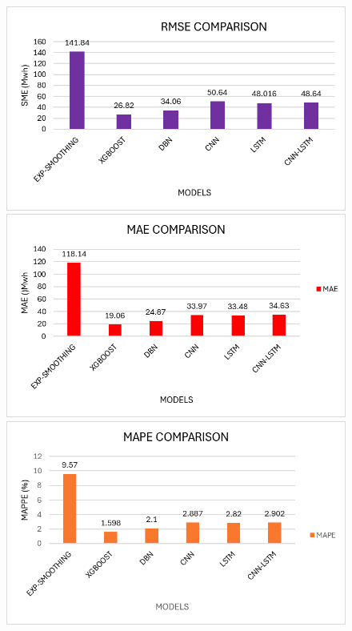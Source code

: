  
 \begin{figure}[h]
 	\centering
 	\begin{minipage}[b]{0.3\linewidth}
 		\includegraphics[width=\linewidth]{Chapters/images/results/RMSE_COMPARISON}
 		\caption{}
 		\label{fig:rmsecomparison}
 	\end{minipage}
 	\begin{minipage}[b]{0.3\linewidth}
 		\includegraphics[width=\linewidth]{Chapters/images/results/MAE_COMPARISON}
 		\caption{}
 		\label{fig:maecomparison}
 	\end{minipage}
 	\begin{minipage}[b]{0.3\linewidth}
 		\includegraphics[width=\linewidth]{Chapters/images/results/MAPE_COMPARISON1}
 		\caption{}
 		\label{fig:mapecomparison1}
 	\end{minipage}
 \end{figure}


 
 
 